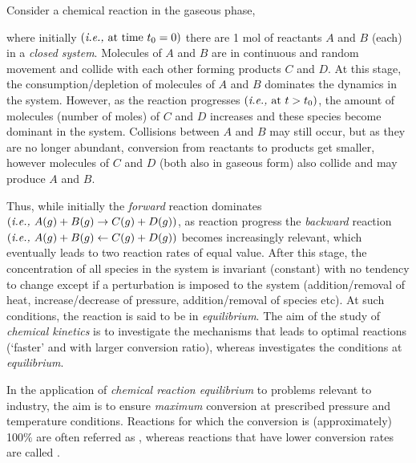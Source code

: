 Consider a chemical reaction in the gaseous phase,

\noindent where initially $\left(\text{{\it i.e., }at time } t_{0}=0\right)$ there are 1 mol of reactants $A$ and $B$ (each) in a {\it closed system}. Molecules of $A$ and $B$ are in continuous and random movement and collide with each other forming products $C$ and $D$. At this stage, the consumption/depletion of molecules of $A$ and $B$ dominates the dynamics in the system. However, as the reaction progresses $\left(\text{{\it i.e., }at } t > t_{0}\right)$, the amount of molecules (\ie number of moles) of $C$ and $D$ increases and these species become dominant in the system. Collisions between $A$ and $B$ may still occur, but as they are no longer abundant, conversion from reactants to products get smaller, however molecules of $C$ and $D$ (both also in gaseous form) also collide and may produce $A$ and $B$. 

Thus, while initially the {\it forward} reaction dominates $\left(\text{{\it i.e., }} A (g) + B (g) \rightarrow C (g) + D (g)\right)$, as reaction progress the {\it backward} reaction $\left(\text{{\it i.e., }} A (g) + B (g) \leftarrow C (g) + D (g)\right)$ becomes increasingly relevant, which eventually leads to two reaction rates of equal value. After this stage, the concentration of all species in the system is invariant (\ie constant) with no tendency to change except if a perturbation is imposed to the system (\eg addition/removal of heat, increase/decrease of pressure, addition/removal of species etc). At such conditions, the reaction is said to be in {\it equilibrium}. The aim of the study of {\it chemical kinetics} is to investigate the mechanisms that leads to optimal reactions (\ie `faster' and with larger conversion ratio), whereas  investigates the conditions at {\it equilibrium}.

In the application of {\it chemical reaction equilibrium} to problems relevant to industry, the aim is to ensure {\it maximum} conversion at prescribed pressure and temperature conditions. Reactions for which the conversion is (approximately) 100$\%$ are often referred as , whereas reactions that have lower conversion rates are called .

